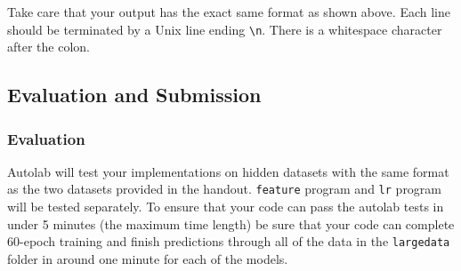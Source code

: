 \documentclass[11pt]{article}
\numberwithin{equation}{section} %
\numberwithin{figure}{section} %
\numberwithin{table}{section} %
\begin{document}
Take care that your output has the exact same format as shown above. Each line should be terminated by a Unix line ending \lstinline{\n}. There is a whitespace character after the colon.

\subsection{Evaluation and Submission}

\subsubsection{Evaluation}

Autolab will test your implementations on hidden datasets with the same format as the two datasets provided in the handout. \lstinline{feature} program and \lstinline{lr} program will be tested separately. To ensure that your code can pass the autolab tests in under 5 minutes (the maximum time length) be sure that your code can complete 60-epoch training and finish predictions through all of the data in the \lstinline{largedata} folder in around one minute for each of the models.
\end{document}
